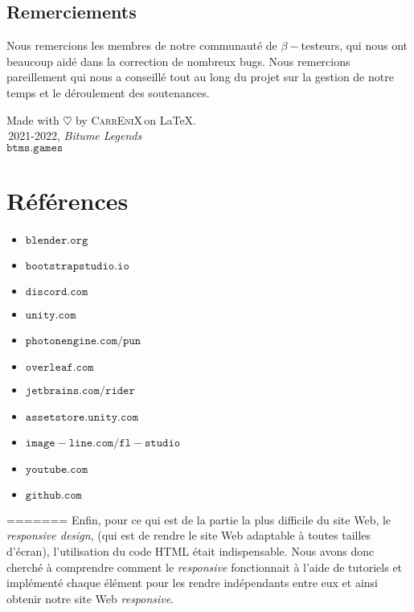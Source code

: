 \documentclass[a4paper,12pt]{article}
\newcommand{\btmlgs}{\textsl{Bitume Legends}}
\newcommand{\CEX}{\textsc{CarrEniX}}
\newcommand{\SITE}{\(\mathtt{btms.games}\)}
\begin{document}
    \subsection{Remerciements}
        Nous remercions les membres de notre communauté de \(\beta-\)testeurs, qui nous ont beaucoup aidé dans la
        correction de nombreux bugs. Nous remercions pareillement  qui nous a conseillé tout au long du projet sur la gestion de notre temps et le déroulement des soutenances.
    
    
    \begin{center}
        Made with $\heartsuit$ by \CEX\,on \LaTeX.\\
        \textcopyright\,2021-2022, \btmlgs\\
        \SITE
    \end{center}

    
    
\section*{Références}
        \begin{itemize}
            \item \(\mathtt{blender.org}\)
            \item \(\mathtt{bootstrapstudio.io}\)
            \item \(\mathtt{discord.com}\)
            \item \(\mathtt{unity.com}\)
            \item \(\mathtt{photonengine.com/pun}\)
            \item \(\mathtt{overleaf.com}\)
            \item \(\mathtt{jetbrains.com/rider}\)
            \item \(\mathtt{assetstore.unity.com}\)
            \item \(\mathtt{image-line.com/fl-studio}\)
            \item \(\mathtt{youtube.com}\)
            \item \(\mathtt{github.com}\)
        \end{itemize}
=======
                Enfin, pour ce qui est de la partie la plus difficile du site Web, le \textit{responsive 
                design}, (qui est de rendre le site Web adaptable à toutes tailles d'écran), l'utilisation 
                du code HTML était indispensable. Nous avons donc cherché à comprendre comment le 
                \textit{responsive} fonctionnait à l'aide de tutoriels et implémenté chaque élément 
                pour les rendre indépendants entre eux et ainsi obtenir notre site Web \textit{responsive}.
\end{document}
